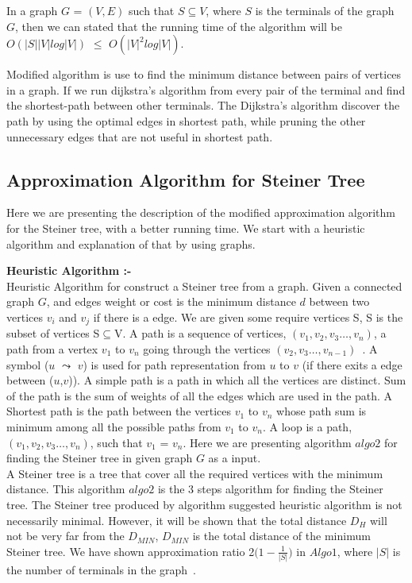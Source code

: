 \begin{lemma} \label{hitsel}
In a graph $G$ = $(V,E)$ such that $S \subseteq V$, where $S$ is the terminals of the graph $G$, then we can stated that the running  time of the algorithm will be $O(|S||V|log|V|)$ $\leq$ $O(|V|^2log|V|)$. 
\end{lemma}

Modified algorithm is use to find the minimum distance between pairs of vertices in a graph. If we run dijkstra's algorithm from every pair of the terminal and find the shortest-path between other terminals. The Dijkstra's algorithm discover the path by using the optimal edges in shortest path, while pruning the other unnecessary edges that are not useful in shortest path.\\

\subsection{Approximation Algorithm for Steiner Tree}
Here we are presenting the description of the modified approximation algorithm for the Steiner tree, with a better running time. We start with a heuristic algorithm and explanation of that by using graphs. 

\textbf{Heuristic Algorithm :- }\\
Heuristic Algorithm for construct a Steiner tree from a graph. Given a connected graph $G$, and edges weight or cost is the minimum distance $d$ between two vertices $v_i$ and $v_j$ if there is a edge. We are given some require vertices S, S is the subset of vertices S$\subseteq$V. A path is a sequence of vertices, $(v_1,v_2,v_3 \dots, v_n)$, a path from a vertex $v_1$ to $v_n$ going through the vertices $(v_2,v_3 \dots, v_{n-1})$~\cite{karger}. A symbol ($u$ $\leadsto$ $v$) is used for path representation from $u$ to $v$ (if there exits a edge between ($u$,$v$)). A simple path is a path in which all the vertices are distinct. Sum of the path is the sum of weights of all the edges which are used in the path. A Shortest path is the path between the vertices $v_1$ to $v_n$ whose path sum is minimum among all the possible paths from $v_1$ to $v_n$. A loop is a path, $(v_1,v_2,v_3 \dots, v_n)$, such that $v_1$ = $v_n$. Here we are presenting algorithm $algo2$ for finding the Steiner tree in given graph $G$ as a input.\\ A Steiner tree is a tree that cover all the required vertices with the minimum distance. This algorithm $algo2$ is the 3 steps algorithm for finding the Steiner tree. The Steiner tree produced by algorithm suggested heuristic algorithm is not necessarily minimal. However, it will be shown that the total distance $D_H$ will not be very far from the $D_{MIN}$, $D_{MIN}$ is the total distance of the minimum Steiner tree. We have shown approximation ratio 2$\Big(1-\frac{1}{|S|}\Big)$ in $Algo1$, where $|S|$ is the number of terminals in the graph~\cite{markowsky}.


